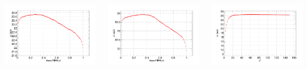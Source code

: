\documentclass[aspectratio=169]{ctexbeamer}
\begin{document}
\begin{frame}
  \begin{columns}
    \begin{column}{0.33\textwidth}
      \centering
      \includegraphics[width=\textwidth]{figures/binaryPID_phikp_fom.png}
    \end{column}
    \begin{column}{0.33\textwidth}
      \centering
      \includegraphics[width=\textwidth]{figures/binaryPID_eekp_fom.png}
    \end{column}
    \begin{column}{0.33\textwidth}
      \centering
      \includegraphics[width=\textwidth]{figures/chisq_fom.png}

\end{column}
\end{columns}
\end{frame}
\end{document}
